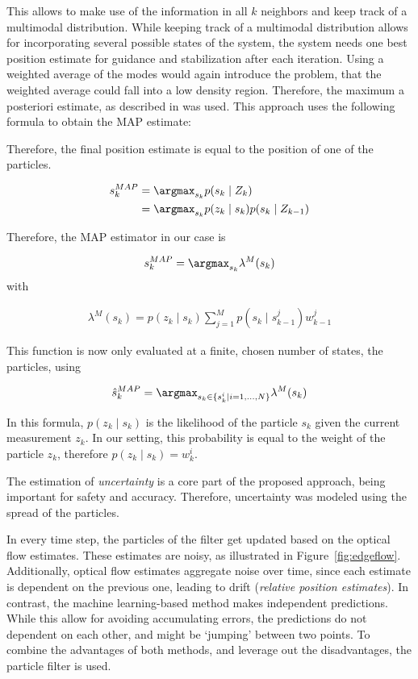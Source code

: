 This allows to make use of the information in all $k$ neighbors and
keep track of a multimodal distribution. While keeping track of a
multimodal distribution allows for incorporating several possible
states of the system, the system needs one best position estimate for guidance and stabilization after each iteration. Using a weighted average of the modes would again introduce the
problem, that the weighted average could fall into a low density
region. Therefore, the maximum a posteriori estimate, as described in
\cite{driessen2008map} was used. This approach uses the following
formula to obtain the MAP estimate:

Therefore, the final position estimate is equal to the position of one
of the particles.

\begin{align}
  s_k^{MAP}  &= \argmax_{s_k}{p(s_k \mid Z_k)}\\
             &= \argmax_{s_k}{p(z_k \mid s_k) p(s_k \mid Z_{k-1})} 
\end{align}

Therefore, the MAP estimator in our case is

\begin{align}
s_k^{MAP} = \argmax_{s_k} \lambda^M(s_k)
\end{align}
with

\begin{align}
\lambda^M(s_k) = p(z_k \mid s_k) \sum_{j=1}^Mp(s_k \mid s_{k-1}^j)w^j_{k-1}
\end{align}

This function is now only evaluated at a finite, chosen number of
states, the particles, using

\begin{align}
\hat{s}_k^{MAP} = \argmax_{s_k \in \{s_k^i \mid i=1,\ldots,N\}} \lambda^M(s_k)
\end{align}

In this formula, $p(z_k \mid s_k)$ is the likelihood of the particle
$s_k$ given the current measurement $z_k$. In our setting, this
probability is equal to the weight of the particle $z_k$, therefore
$p(z_k \mid s_k) = w^i_k$.

The estimation of \emph{uncertainty} is a core part of the proposed
approach, being important for safety and accuracy. Therefore,
uncertainty was modeled using the spread of the particles.

In every time step, the particles of the filter get updated based on
the optical flow estimates. These estimates are noisy, as illustrated
in Figure~\ref{fig:edgeflow}. Additionally, optical flow estimates
aggregate noise over time, since each estimate is dependent on the
previous one, leading to drift (\emph{relative position
  estimates}). In contrast, the machine learning-based method makes
independent predictions. While this allow for avoiding accumulating
errors, the predictions do not dependent on each other, and might be
`jumping' between two points. To combine the advantages of both
methods, and leverage out the disadvantages, the particle filter is
used.

